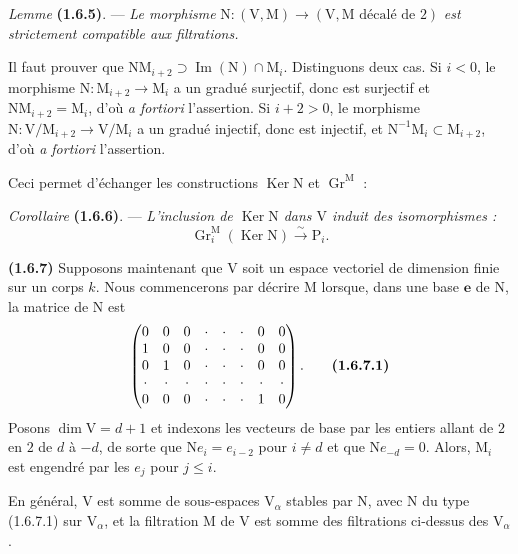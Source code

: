 \documentclass[11pt,leqno]{article}
\begin{document}
\textit{Lemme} \textbf{(1.6.5)}. — \textit{Le morphisme} \(\mathrm{N}:(\mathrm{V},\mathrm{M})\to(\mathrm{V},\mathrm{M}\text{ décalé de }2)\) \textit{est strictement compatible aux filtrations.}

Il faut prouver que \(\mathrm{N}\mathrm{M}_{i+2}\supset\operatorname{Im}(\mathrm{N})\cap\mathrm{M}_i\). Distinguons deux cas. Si \(i<0\), le morphisme \(\mathrm{N}:\mathrm{M}_{i+2}\to\mathrm{M}_i\) a un gradué surjectif, donc est surjectif et \(\mathrm{N}\mathrm{M}_{i+2}=\mathrm{M}_i\), d’où \textit{a fortiori} l’assertion. Si \(i+2>0\), le morphisme \(\mathrm{N}:\mathrm{V}/\mathrm{M}_{i+2}\to\mathrm{V}/\mathrm{M}_i\) a un gradué injectif, donc est injectif, et \(\mathrm{N}^{-1}\mathrm{M}_i\subset\mathrm{M}_{i+2}\), d’où \textit{a fortiori} l’assertion.

Ceci permet d’échanger les constructions \(\operatorname{Ker}\mathrm{N}\) et \(\operatorname{Gr}^{\mathrm{M}}\) :

\textit{Corollaire} \textbf{(1.6.6)}. — \textit{L’inclusion de \(\operatorname{Ker}\mathrm{N}\) dans \(\mathrm{V}\) induit des isomorphismes :}
\[
\operatorname{Gr}_i^{\mathrm{M}}(\operatorname{Ker}\mathrm{N})
\xrightarrow{\sim}\mathrm{P}_i.
\]

\textbf{(1.6.7)} Supposons maintenant que \(\mathrm{V}\) soit un espace vectoriel de dimension finie sur un corps \(k\). Nous commencerons par décrire \(\mathrm{M}\) lorsque, dans une base \(\mathbf{e}\) de \(\mathrm{N}\), la matrice de \(\mathrm{N}\) est
\[
\begin{pmatrix}
0 & 0 & 0 & \cdot & \cdot & \cdot & 0 & 0\\
1 & 0 & 0 & \cdot & \cdot & \cdot & 0 & 0\\
0 & 1 & 0 & \cdot & \cdot & \cdot & 0 & 0\\
\cdot & \cdot & \cdot & \cdot & \cdot & \cdot & \cdot & \cdot\\
0 & 0 & 0 & \cdot & \cdot & \cdot & 1 & 0
\end{pmatrix}.
\tag*{\textbf{(1.6.7.1)}}
\]
Posons \(\dim\mathrm{V}=d+1\) et indexons les vecteurs de base par les entiers allant de \(2\) en \(2\) de \(d\) à \(-d\), de sorte que \(\mathrm{N}e_i=e_{i-2}\) pour \(i\ne d\) et que \(\mathrm{N}e_{-d}=0\). Alors, \(\mathrm{M}_i\) est engendré par les \(e_j\) pour \(j\le i\).

En général, \(\mathrm{V}\) est somme de sous-espaces \(\mathrm{V}_\alpha\) stables par \(\mathrm{N}\), avec \(\mathrm{N}\) du type (1.6.7.1) sur \(\mathrm{V}_\alpha\), et la filtration \(\mathrm{M}\) de \(\mathrm{V}\) est somme des filtrations ci-dessus des \(\mathrm{V}_\alpha\).
\end{document}
